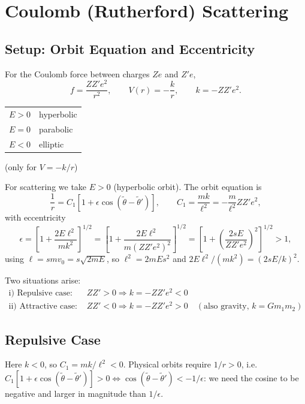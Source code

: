 \documentclass[11pt]{article}
\begin{document}
\section{Coulomb (Rutherford) Scattering}

\subsection{Setup: Orbit Equation and Eccentricity}

For the Coulomb force between charges $Ze$ and $Z'e$,
\[
f = \frac{ZZ'e^2}{r^2}, \qquad V(r) = -\frac{k}{r}, \qquad k = -ZZ'e^2.
\]

\begin{center}
\begin{tabular}{ll}
$E>0$ & hyperbolic \\
$E=0$ & parabolic \\
$E<0$ & elliptic
\end{tabular}
\quad (only for $V = -k/r$)
\end{center}

For scattering we take $E>0$ (hyperbolic orbit). The orbit equation is
\[
\frac{1}{r} = C_1\left[1 + \epsilon\cos(\tilde\theta - \tilde\theta')\right], \qquad
C_1 = \frac{mk}{\ell^2} = -\frac{m}{\ell^2}ZZ'e^2,
\]
with eccentricity
\[
\epsilon = \left[1 + \frac{2E\ell^2}{mk^2}\right]^{1/2}
= \left[1 + \frac{2E\ell^2}{m(ZZ'e^2)^2}\right]^{1/2}
= \left[1 + \left(\frac{2sE}{ZZ'e^2}\right)^2\right]^{1/2} > 1,
\]
using $\ell = s m v_0 = s\sqrt{2mE}$, so $\ell^2 = 2mEs^2$ and $2E\ell^2/(mk^2) = (2sE/k)^2$.

Two situations arise:
\begin{align*}
\text{i) Repulsive case: } & ZZ' > 0 \Rightarrow k = -ZZ'e^2 < 0 \\
\text{ii) Attractive case: } & ZZ' < 0 \Rightarrow k = -ZZ'e^2 > 0 \quad (\text{also gravity, } k = Gm_1m_2)
\end{align*}

\subsection{Repulsive Case}

Here $k<0$, so $C_1 = mk/\ell^2 < 0$. Physical orbits require $1/r>0$, i.e.
$C_1[1+\epsilon\cos(\tilde\theta-\tilde\theta')] > 0 \Leftrightarrow \cos(\tilde\theta-\tilde\theta') < -1/\epsilon$:
we need the cosine to be negative and larger in magnitude than $1/\epsilon$.
\end{document}

